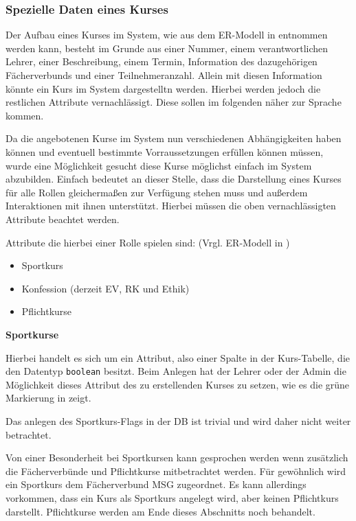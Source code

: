 \subsubsection{Spezielle Daten eines Kurses}

Der Aufbau eines Kurses im System, wie aus dem ER-Modell in  entnommen werden kann, besteht im Grunde aus einer Nummer, einem verantwortlichen Lehrer, einer Beschreibung, einem Termin, Information des dazugehörigen Fächerverbunds  und einer Teilnehmeranzahl. Allein mit diesen Information könnte ein Kurs im System dargestelltn werden. Hierbei werden jedoch die restlichen Attribute vernachlässigt. Diese sollen im folgenden näher zur Sprache kommen.  

Da die angebotenen Kurse im System nun verschiedenen Abhängigkeiten haben können und eventuell bestimmte Vorraussetzungen erfüllen können müssen, wurde eine Möglichkeit gesucht diese Kurse möglichst einfach im System abzubilden. 
Einfach bedeutet an dieser Stelle, dass die Darstellung eines Kurses für alle Rollen gleichermaßen zur Verfügung stehen muss und außerdem Interaktionen mit ihnen unterstützt.
Hierbei müssen die oben vernachlässigten Attribute beachtet werden. 

Attribute die hierbei einer Rolle spielen sind: (Vrgl. ER-Modell in )
\begin{itemize}
  \item Sportkurs
  \item Konfession (derzeit EV, RK und Ethik)
  \item Pflichtkurse
\end{itemize}

\textbf{Sportkurse}

Hierbei handelt es sich um ein Attribut, also einer Spalte in der Kurs-Tabelle, die den Datentyp \texttt{boolean} besitzt.
Beim Anlegen hat der Lehrer oder der Admin die Möglichkeit dieses Attribut des zu erstellenden Kurses zu setzen, wie es die grüne Markierung in  zeigt.

Das anlegen des Sportkurs-Flags in der DB ist trivial und wird daher nicht weiter betrachtet.

Von einer Besonderheit bei Sportkursen kann gesprochen werden wenn zusätzlich die Fächerverbünde und Pflichtkurse mitbetrachtet werden.
Für gewöhnlich wird ein Sportkurs dem Fächerverbund \ac{MSG} zugeordnet. Es kann allerdings vorkommen, dass ein Kurs als Sportkurs angelegt wird, aber keinen Pflichtkurs darstellt.  
Pflichtkurse werden am Ende dieses Abschnitts noch behandelt.

